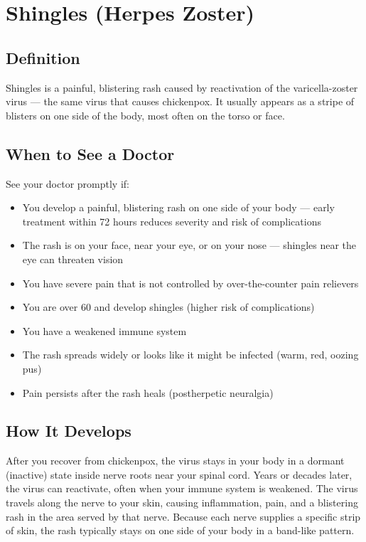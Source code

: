 \chapter{Shingles (Herpes Zoster)}

\section*{Definition}
Shingles is a painful, blistering rash caused by reactivation of the varicella-zoster virus — the same virus that causes chickenpox. It usually appears as a stripe of blisters on one side of the body, most often on the torso or face.

\section*{When to See a Doctor}
See your doctor promptly if:
\begin{itemize}
  \item You develop a painful, blistering rash on one side of your body — early treatment within 72 hours reduces severity and risk of complications
  \item The rash is on your face, near your eye, or on your nose — shingles near the eye can threaten vision
  \item You have severe pain that is not controlled by over-the-counter pain relievers
  \item You are over 60 and develop shingles (higher risk of complications)
  \item You have a weakened immune system
  \item The rash spreads widely or looks like it might be infected (warm, red, oozing pus)
  \item Pain persists after the rash heals (postherpetic neuralgia)
\end{itemize}

\section*{How It Develops}
After you recover from chickenpox, the virus stays in your body in a dormant (inactive) state inside nerve roots near your spinal cord. Years or decades later, the virus can reactivate, often when your immune system is weakened. The virus travels along the nerve to your skin, causing inflammation, pain, and a blistering rash in the area served by that nerve. Because each nerve supplies a specific strip of skin, the rash typically stays on one side of your body in a band-like pattern.

